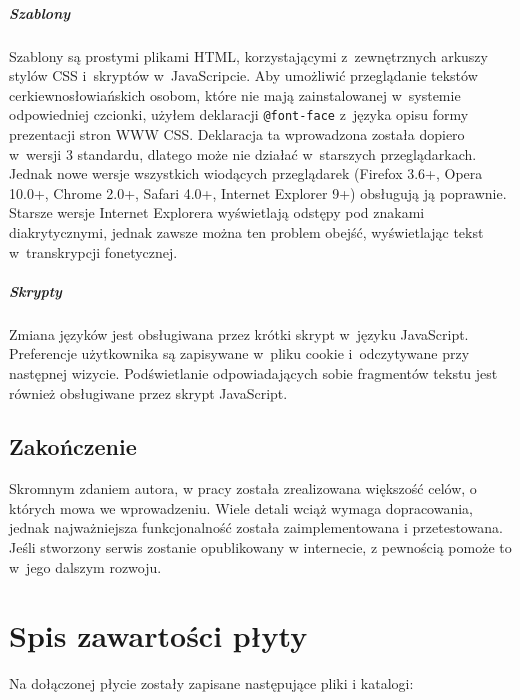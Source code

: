 \documentclass{pracamgr}
\begin{document}
\paragraph{Szablony}
Szablony są prostymi plikami HTML, korzystającymi z~zewnętrznych
arkuszy stylów CSS i~skryptów w~JavaScripcie. Aby umożliwić
przeglądanie tekstów cerkiewno\-{}słowiańskich osobom, które nie mają
zainstalowanej w~systemie odpowiedniej czcionki, użyłem deklaracji
{\tt @font-face} z~języka opisu formy prezentacji stron WWW
CSS. Deklaracja ta wprowadzona została dopiero w~wersji 3 standardu,
dlatego może nie działać w~starszych przeglądarkach. Jednak nowe
wersje wszystkich wiodących przeglądarek (Firefox 3.6+, Opera
10.0+, Chrome 2.0+, Safari 4.0+, Internet Explorer 9+) obsługują ją
poprawnie. Starsze wersje Internet Explorera wyświetlają odstępy pod
znakami diakrytycznymi, jednak zawsze można ten problem obejść,
wyświetlając tekst w~transkrypcji fonetycznej.

\paragraph{Skrypty}
Zmiana języków jest obsługiwana przez krótki skrypt w~języku
JavaScript. Preferencje użytkownika są zapisywane w~pliku cookie
i~odczytywane przy następnej wizycie. Podświetlanie odpowiadających
sobie fragmentów tekstu jest również obsługiwane przez skrypt
JavaScript.

\section{Zakończenie}

Skromnym zdaniem autora, w pracy została zrealizowana większość celów,
o których mowa we wprowadzeniu. Wiele detali wciąż wymaga
dopracowania, jednak najważniejsza funkcjonalność została
zaimplementowana i przetestowana. Jeśli stworzony serwis zostanie
opublikowany w internecie, z pewnością pomoże to w~jego dalszym
rozwoju.


\appendix

\chapter{Spis zawartości płyty}

Na dołączonej płycie zostały zapisane następujące pliki i katalogi:
\end{document}
